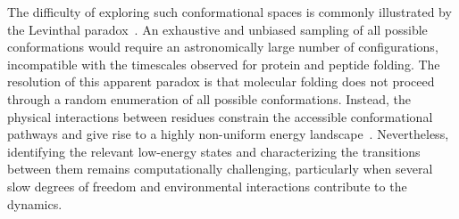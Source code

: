 The difficulty of exploring such conformational spaces is commonly illustrated by the Levinthal paradox~\cite{Levinthal_paradox,Levinthal_paradox_2}. An exhaustive and unbiased sampling of all possible conformations would require an astronomically large number of configurations, incompatible with the timescales observed for protein and peptide folding. The resolution of this apparent paradox is that molecular folding does not proceed through a random enumeration of all possible conformations. Instead, the physical interactions between residues constrain the accessible conformational pathways and give rise to a highly non-uniform energy landscape~\cite{Levinthal_paradox,robert2021resource,Levinthal_paradox_2}. Nevertheless, identifying the relevant low-energy states and characterizing the transitions between them remains computationally challenging, particularly when several slow degrees of freedom and environmental interactions contribute to the dynamics.


